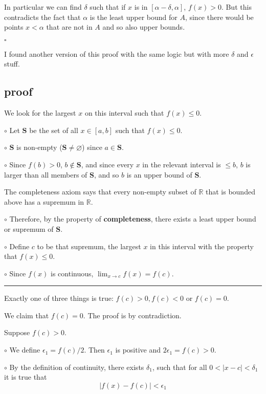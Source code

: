 \documentclass[11pt, oneside]{article}
\begin{document}
In particular we can find $\delta$ such that if $x$ is in $[\alpha - \delta, \alpha]$, $f(x) > 0$. But this contradicts the fact that $\alpha$ is the least upper bound for $A$, since there would be points $x < \alpha$ that are not in $A$ and so also upper bounds.

$\square$

I found another version of this proof with the same logic but with more $\delta$ and $\epsilon$ stuff.

\subsection*{proof}

We look for the largest $x$ on this interval such that $f(x) \le 0$.

$\circ$  Let $\mathbf{S}$ be the set of all $x \in [a,b]$ such that $f(x) \le 0$.  

$\circ$  $\mathbf{S}$ is non-empty ($\mathbf{S} \ne \varnothing$) since $a \in \mathbf{S}$.  

$\circ$  Since $f(b) > 0$, $b \notin \mathbf{S}$, and since every $x$ in the relevant interval is $\le b$, $b$ is larger than all members of $\mathbf{S}$, and so $b$ is an upper bound of $\mathbf{S}$.

The completeness axiom says that every non-empty subset of $\mathbb{R}$ that is bounded above has a supremum in $\mathbb{R}$.

$\circ$  Therefore, by the property of \textbf{completeness}, there exists a least upper bound or supremum of $\mathbf{S}$. 

$\circ$  Define $c$ to be that supremum, the largest $x$ in this interval with the property that $f(x) \le 0$.

$\circ$  Since $f(x)$ is continuous, $\lim_{x \rightarrow c} f(x) = f(c)$.

\noindent\rule{2cm}{0.4pt}

Exactly one of three things is true:  $f(c) > 0, f(c) < 0$ or $f(c) = 0$.  

We claim that $f(c) = 0$.  The proof is by contradiction.  

Suppose $f(c) > 0$.

$\circ$  We define $\epsilon_1 = f(c)/2$.  Then $\epsilon_1$ is positive and $2 \epsilon_1 = f(c) > 0$.

$\circ$  By the definition of continuity, there exists $\delta_1$, such that for all $0 < |x - c| < \delta_1$ it is true that
\[ |f(x) - f(c)| < \epsilon_1 \]
\end{document}
